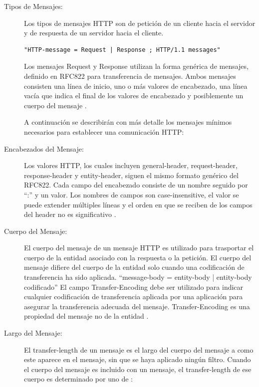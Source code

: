 \begin{description}
\item[Tipos de Mensajes:] 

Los tipos de mensajes HTTP son de petición de un cliente hacia el servidor y de respuesta de un servidor hacia el cliente.

\begin{lstlisting}[caption={Tipos de mensajes HTTP},label={lst:mensajes_http}]
"HTTP-message = Request | Response ; HTTP/1.1 messages"
\end{lstlisting}

Los mensajes Request y Response utilizan la forma genérica de mensajes, definido en RFC822 para transferencia de mensajes. Ambos mensajes consisten una línea de inicio, uno o más valores de encabezado, una línea vacía que indica el final de los valores de encabezado y posiblemente un cuerpo del mensaje \cite{rfc2616}.

A continuación se describirán con más detalle los mensajes mínimos necesarios para establecer una comunicación HTTP: 

\item[Encabezados del Mensaje:] 
Los valores HTTP, los cuales incluyen general-header, request-header, response-header y entity-header, siguen el mismo formato genérico del RFC822. Cada campo del encabezado consiste de un nombre seguido por “:” y un valor. Los nombres de campos son case-insensitive, el valor se puede extender múltiples líneas y el orden en que se reciben de los campos del header no es significativo \cite{rfc2616}.

\item[Cuerpo del Mensaje:] 

El cuerpo del mensaje de un mensaje HTTP es utilizado para trasportar el cuerpo de la entidad asociado con la respuesta o la petición. El cuerpo del mensaje difiere del cuerpo de la entidad solo cuando una codificación de transferencia ha sido aplicada. “message-body = entity-body | entity-body codificado”  
El campo Transfer-Encoding debe ser utilizado para indicar cualquier codificación de transferencia aplicada por una aplicación para asegurar la transferencia adecuada del mensaje. Transfer-Encoding es una propiedad del mensaje no de la entidad \cite{rfc2616}.

\item[Largo del Mensaje:] 

El transfer-length de un mensaje es el largo del cuerpo del mensaje a como este aparece en el mensaje, sin que se haya aplicado ningún filtro. Cuando el cuerpo del mensaje es incluido con un mensaje, el transfer-length de ese cuerpo es determinado por uno de \cite{rfc2616}: 
\begin{itemize}


\end{itemize}
\end{description}
